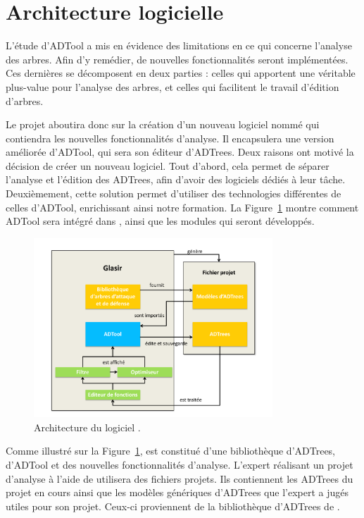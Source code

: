 \section{Architecture logicielle}
	\label{section:archi}

L'étude d'ADTool a mis en évidence des limitations en ce qui concerne l'analyse des arbres. Afin d'y remédier, de nouvelles fonctionnalités seront implémentées. Ces dernières se décomposent en deux parties : celles qui apportent une véritable plus-value pour l'analyse des arbres, et celles qui facilitent le travail d'édition d'arbres. 

Le projet aboutira donc sur la création d'un nouveau logiciel nommé \glasir{} qui contiendra les nouvelles fonctionnalités d'analyse. Il encapsulera une version améliorée d'ADTool, qui sera son éditeur d'ADTrees. Deux raisons ont motivé la décision de créer un nouveau logiciel. Tout d'abord, cela permet de séparer l'analyse et l'édition des ADTrees, afin d'avoir des logiciels dédiés à leur tâche. Deuxièmement, cette solution permet d'utiliser des technologies différentes de celles d'ADTool, enrichissant ainsi notre formation. La {\sc Figure}~\ref{fig:architecture_Glasir} montre comment ADTool sera intégré dans \glasir{}, ainsi que les modules qui seront développés. %

	\begin{figure}[h!]
		\centering
			\includegraphics[width=0.8\textwidth]{figure/archiGlasir.pdf}
		\caption{Architecture du logiciel \glasir{}.}
		\label{fig:architecture_Glasir}
	\end{figure}

Comme illustré sur la {\sc Figure}~\ref{fig:architecture_Glasir}, \glasir{} est constitué d'une bibliothèque d'ADTrees, d'ADTool et des nouvelles fonctionnalités d'analyse. L'expert réalisant un projet d'analyse à l'aide de \glasir{} utilisera des fichiers projets. Ils contiennent les ADTrees du projet en cours ainsi que les modèles génériques d'ADTrees que l'expert a jugés utiles pour son projet. Ceux-ci proviennent de la bibliothèque d'ADTrees de \glasir{}.
	

